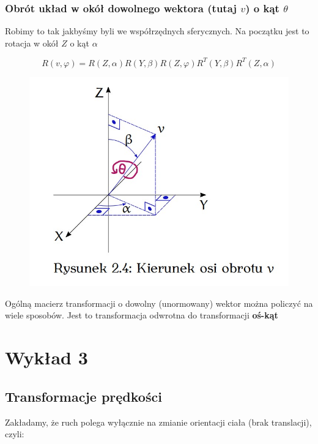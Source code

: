 \documentclass{article}
\begin{document}
\subsubsection{Obrót układ w okół dowolnego wektora (tutaj $v$) o kąt $\theta$}

Robimy to tak jakbyśmy byli we współrzędnych sferycznych. Na początku jest to rotacja w okół $Z$ o kąt $\alpha$

\Large
$$
    R\left(v, \varphi\right)=
    R(Z, \alpha)R(Y,\beta)R(Z, \varphi)R^{T}(Y, \beta)R^{T}(Z, \alpha)
$$
\normalsize


\begin{figure}[h!]
    \centering
    \includegraphics[scale=0.5]{img/kierunek_osi_obrotu.jpg}
\end{figure}

Ogólną macierz transformacji o dowolny (unormowany) wektor można policzyć na wiele sposobów.
Jest to transformacja odwrotna do transformacji {\bf oś-kąt}

\newpage

\section{Wykład 3}

\subsection{Transformacje prędkości}

Zakładamy, że ruch polega wyłącznie na zmianie orientacji ciała (brak translacji), czyli:
\end{document}
